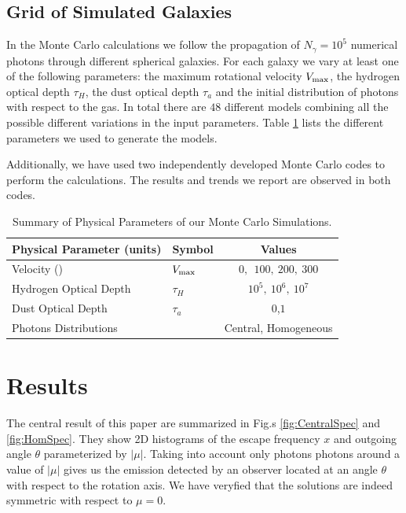\documentclass{emulateapj}
\newcommand{\kms}{{\ifmmode{{\mathrm{\,km\ s}^{-1}}}\else{\,km~s$^{-1}$}\fi}}
\begin{document}
\subsection{Grid of Simulated Galaxies}
\label{sec:models}

In the Monte Carlo calculations we follow the propagation of $N_{\gamma}=10^5$
numerical photons through different spherical galaxies. 
For each galaxy we vary at least one of the following parameters: the maximum
rotational velocity $V_{\rm max}$, the hydrogen optical depth $\tau_{H}$,
the dust optical depth $\tau_{a}$ and the initial distribution of photons
with respect to the gas. 
In total there are $48$ different models combining all the possible
different variations in the input parameters.
Table \ref{table:models} lists the different parameters we used to
generate the models.

Additionally, we have used two independently developed Monte Carlo
codes \citep{CLARA,DijkstraKramer} to perform the calculations. 
The results and trends we report are observed in both codes.  

\begin{table}
\begin{center}
\begin{tabular}{llc}\hline\hline
Physical Parameter (units) & Symbol & Values\\\hline
Velocity (\kms) & $V_{\rm max}$&$0,\ \ 100,\ 200,\ 300$\\
Hydrogen Optical Depth & $\tau_{H} $ & $10^{5},\ 10^{6},\ 10^{7}$\\
Dust Optical Depth & $\tau_{a}$ & $0$,$1$\\
Photons Distributions & & Central, Homogeneous\\\hline\hline
\end{tabular}
\caption{
  Summary of Physical Parameters of our Monte Carlo Simulations.} 
\label{table:models}
\end{center}
\end{table}




\section{Results}
\label{sec:results}

The central result of this paper are summarized in Fig.s
\ref{fig:CentralSpec} and \ref{fig:HomSpec}. 
They show 2D histograms of the escape frequency $x$ and outgoing angle
$\theta$ parameterized by $|\mu|$. 
Taking into account only photons photons around a value
of $|\mu|$ gives us the emission detected by an observer located at an
angle $\theta$ with respect to the rotation axis. 
We have veryfied that the solutions are indeed symmetric with respect
to $\mu=0$.   
\end{document}
